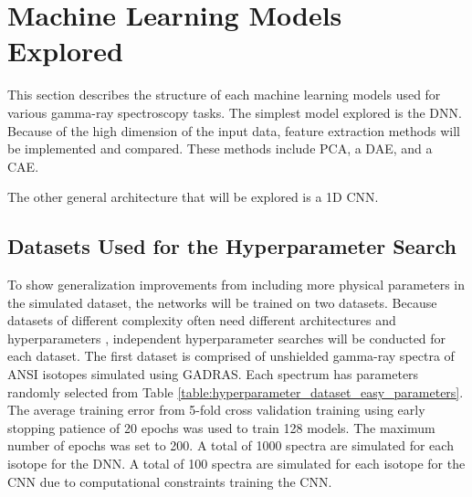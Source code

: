 \chapter{Machine Learning Models Explored}

This section describes the structure of each machine learning models used for various gamma-ray spectroscopy tasks. The simplest model explored is the DNN. Because of the high dimension of the input data, feature extraction methods will be implemented and compared. These methods include PCA, a DAE, and a CAE. 

The other general architecture that will be explored is a 1D CNN. 


\section{Datasets Used for the Hyperparameter Search}

To show generalization improvements from including more physical parameters in the simulated dataset, the networks will be trained on two datasets. Because datasets of different complexity often need different architectures and hyperparameters \cite{Bergstra2012}, independent hyperparameter searches will be conducted for each dataset. The first dataset is comprised of unshielded gamma-ray spectra of ANSI isotopes simulated using GADRAS. Each spectrum has parameters randomly selected from Table \ref{table:hyperparameter_dataset_easy_parameters}. The average training error from 5-fold cross validation training using early stopping patience of 20 epochs was used to train 128 models. The maximum number of epochs was set to 200. A total of 1000 spectra are simulated for each isotope for the DNN. A total of 100 spectra are simulated for each isotope for the CNN due to computational constraints training the CNN.

